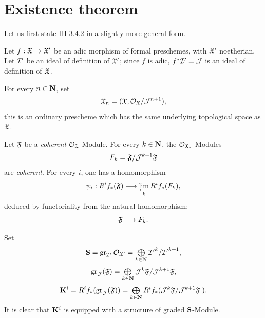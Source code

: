 \section{Existence theorem}

Let us first state \EGA III 3.4.2 in a slightly more
general form.

Let $f:\formelX \to \formelX'$ be an adic morphism of formal preschemes, with $\mathfrak{X}'$ noetherian. Let ${\mathcal I}'$ be an ideal of definition of $\mathfrak{X}'$; since $f$ is adic, $f^*{\mathcal I}'={\mathcal J}$ is an ideal of definition of $\mathfrak{X}$.

For every $n\in \mathbf{N}$, set \label{IX.2}
\begin{equation} \label{eq:IX.2.1}
\mathfrak{X}_n=(\mathfrak{X}, {\mathcal O}_{\mathfrak{X}}/{\mathcal{J}}^{n+1}),
\end{equation}
this is an ordinary prescheme which has the same underlying topological space as $\mathfrak{X}$.

Let $\mathfrak{F}$ be a \emph{coherent} ${\mathcal O}_{\mathfrak{X}}$-Module. For every $k\in\mathbf{N}$, the ${\mathcal O}_{\mathfrak{X}_k}$-Modules
\begin{equation} \label{eq:IX.2.2}
F_k=\mathfrak{F}/{\mathcal{J}}^{k+1}\mathfrak{F}
\end{equation}
are \emph{coherent}. For every $i$, one has a homomorphism
\begin{equation} \label{eq:IX.2.3} \psi_i: R^if_*(\formelF) \to \varprojlim_k R^if_*(F_k),
\end{equation}
deduced by functoriality from the natural homomorphism:
\begin{equation} \label{eq:IX.2.4} \formelF \to F_k.
\end{equation}

Set
\begin{equation} \label{eq:IX.2.5}
{\mathbf S}= \operatorname{gr}_{{{\mathcal I}'}}{\mathcal O}_{\mathfrak{X}'}=\mathop{\textstyle\bigoplus}\limits_{k \in \mathbf{N}} {{\mathcal I}'}^k/{{\mathcal I}'}^{k+1},
\end{equation}
\begin{equation} \label{eq:IX.2.6} \operatorname{gr}_{\mathcal{J}}(\mathfrak{F})=\mathop{\textstyle\bigoplus}\limits_{k \in \mathbf{N}} {\mathcal{J}}^k\mathfrak{F}/{\mathcal{J}}^{k+1}\mathfrak{F},
\end{equation}
\begin{equation} \label{eq:IX.2.7} \mathbf{K}^i=R^if_*(\operatorname{gr}_{{\mathcal{J}}}(\mathfrak{F}))=\mathop{\textstyle\bigoplus}\limits_{k \in \mathbf{N}}R^if_* ({\mathcal{J}}^k \mathfrak{F}/{\mathcal{J}}^{k+1}\mathfrak{F}\;).
\end{equation}
It is clear that $\mathbf{K}^i$ is equipped with a structure of graded ${\mathbf S}$-Module.

